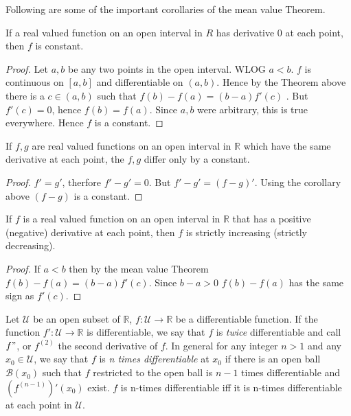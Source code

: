 Following are some of the important corollaries of the mean value Theorem.
\begin{Corollary}
    If a real valued function on an open interval in $R$ has derivative $0$ at each point, then $f$
    is constant.
\end{Corollary}
\begin{proof}
    Let $a,b$ be any two points in the open interval. WLOG $a < b$. $f$ is continuous on
    $\left[a,b\right]$ and differentiable on $(a,b)$. Hence by the Theorem above there is a $c \in
    (a,b)$ such that $f(b) - f(a) = (b-a)f'(c)$ . But $f'(c) = 0$, hence $f(b) = f(a)$. Since $a,b$
    were arbitrary, this is true everywhere. Hence $f$ is a constant.
\end{proof}
\begin{Corollary}
    If $f,g$ are real valued functions on an open interval in $\mathbb{R}$ which have the same
    derivative at each point, the $f,g$ differ only by a constant.
\end{Corollary}
\begin{proof}
    $f' = g'$, therfore $f' - g' = 0$. But $f' - g' = (f - g)'$. Using the corollary above $(f- g)$
    is a constant.
\end{proof}
\begin{Corollary}
    If $f$ is a real valued function on an open interval in $\mathbb{R}$ that has a positive
    (negative) derivative at each point, then $f$ is strictly increasing (strictly decreasing).
\end{Corollary}
\begin{proof}
    If $a < b$ then by the mean value Theorem $f(b) - f(a) = (b - a)f'(c)$. Since $b-a > 0$ $f(b) -
    f(a)$ has the same sign as $f'(c)$.
\end{proof}
\begin{Definition}
    Let $\mathcal{U}$ be an open subset of $\mathbb{R}$, $f : \mathcal{U} \to \mathbb{R}$ be a
    differentiable function. If the function $f' : \mathcal{U} \to \mathbb{R}$ is differentiable, we
    say that $f$ is \emph{twice} differentiable and call $f"$, or $f^{(2)}$ the second derivative of
    $f$. In general for any integer $n > 1$ and any $x_0 \in \mathcal{U}$, we say that $f$ is
    \emph{n times differentiable} at $x_0$ if there is an open ball $\mathcal{B}(x_0)$ such that $f$
    restricted to the open ball is $n - 1$ times differentiable and $(f^{(n-1)})'(x_0)$ exist. $f$
    is n-times differentiable iff it is n-times differentiable at each point in $\mathcal{U}$. 
\end{Definition}

